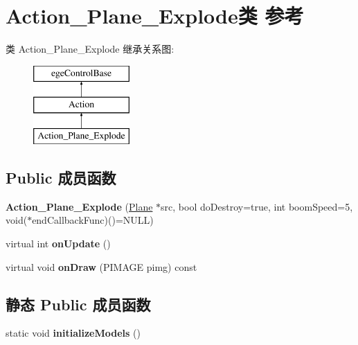 \hypertarget{class_action___plane___explode}{}\section{Action\+\_\+\+Plane\+\_\+\+Explode类 参考}
\label{class_action___plane___explode}
类 Action\+\_\+\+Plane\+\_\+\+Explode 继承关系图\+:\begin{figure}[H]
\begin{center}
\leavevmode
\includegraphics[height=3.000000cm]{class_action___plane___explode}
\end{center}
\end{figure}
\subsection*{Public 成员函数}
\begin{DoxyCompactItemize}
\item 
\mbox{\label{class_action___plane___explode_aa7aeb998cd636ad6d0b42d9e23a43b57}} 
{\bfseries Action\+\_\+\+Plane\+\_\+\+Explode} (\hyperlink{class_plane}{Plane} $\ast$src, bool do\+Destroy=true, int boom\+Speed=5, void($\ast$end\+Callback\+Func)()=N\+U\+LL)
\item 
\mbox{\label{class_action___plane___explode_a1786450893420df4539056e93dcdc3b6}} 
virtual int {\bfseries on\+Update} ()
\item 
\mbox{\label{class_action___plane___explode_a8436b3848df9d2f27434d5b7bebea525}} 
virtual void {\bfseries on\+Draw} (P\+I\+M\+A\+GE pimg) const
\end{DoxyCompactItemize}
\subsection*{静态 Public 成员函数}
\begin{DoxyCompactItemize}
\item 
\mbox{\label{class_action___plane___explode_a797e8de15934ea7370086bde4cc45015}} 
static void {\bfseries initialize\+Models} ()
\end{DoxyCompactItemize}
